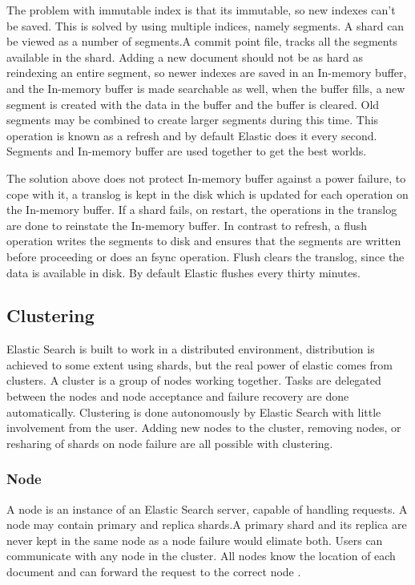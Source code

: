 \documentclass[12pt]{article}
\begin{document}
				The problem with immutable index is that its immutable, so new indexes can't be saved. This is solved by using multiple indices, namely segments. A shard can be viewed as a number of segments.A commit point file, tracks all the segments available in the shard. Adding a new document should not be as hard as reindexing an entire segment, so newer indexes are saved in an In-memory buffer, and the In-memory buffer is made searchable as well, when the buffer fills, a new segment is created with the data in the buffer and the buffer is cleared. Old segments may be combined to create larger segments during this time. This operation is known as a refresh and by default Elastic does it every second. Segments and In-memory buffer are used together to get the best worlds.

				The solution above does not protect In-memory buffer against a power failure, to cope with it, a translog is kept in the disk which is updated for each operation on the In-memory buffer. If a shard fails, on restart, the operations in the translog are done to reinstate the In-memory buffer. In contrast to refresh, a flush operation writes the segments to disk and ensures that the segments are written before proceeding or does an fsync operation. Flush clears the translog, since the data is available in disk. By default Elastic flushes every thirty minutes.

		\subsection{Clustering}
			Elastic Search is built to work in a distributed environment, distribution is achieved to some extent using shards, but the real power of elastic comes from clusters. A cluster is a group of nodes working together. Tasks are delegated between the nodes and node acceptance and failure recovery are done automatically. Clustering is done autonomously by Elastic Search with little involvement from the user. Adding new nodes to the cluster, removing nodes, or resharing of shards on node failure are all possible with clustering.

			\subsubsection{Node}
				A node is an instance of an Elastic Search server, capable of handling requests. A node may contain primary and replica shards.A primary shard and its replica are never kept in the same node as a node failure would elimate both. Users can communicate with any node in the cluster. All nodes know the location of each document and can forward the request to the correct node \cite{ijsr}.
\end{document}
